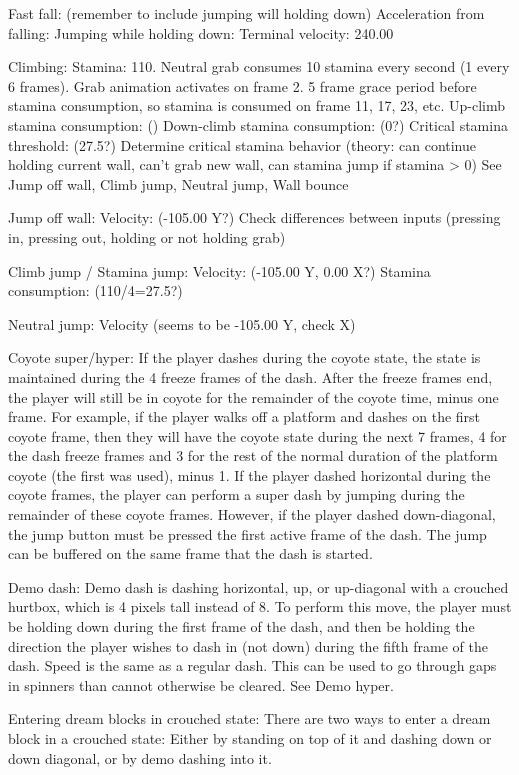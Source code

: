 \documentclass[oneside]{book}
\begin{document}
Fast fall: (remember to include jumping will holding down)
Acceleration from falling:
Jumping while holding down:
Terminal velocity: 240.00



Climbing:
Stamina: 110. Neutral grab consumes 10 stamina every second (1 every 6 frames). Grab animation activates on frame 2. 5 frame grace period before stamina consumption, so stamina is consumed on frame 11, 17, 23, etc.
Up-climb stamina consumption: ()
Down-climb stamina consumption: (0?)
Critical stamina threshold: (27.5?)
Determine critical stamina behavior (theory: can continue holding current wall, can't grab new wall, can stamina jump if stamina > 0)
See Jump off wall, Climb jump, Neutral jump, Wall bounce

Jump off wall:
Velocity: (-105.00 Y?)
Check differences between inputs (pressing in, pressing out, holding or not holding grab)

Climb jump / Stamina jump:
Velocity: (-105.00 Y, 0.00 X?)
Stamina consumption: (110/4=27.5?)

Neutral jump:
Velocity (seems to be -105.00 Y, check X)

Coyote super/hyper:
If the player dashes during the coyote state, the state is maintained during the 4 freeze frames of the dash. After the freeze frames end, the player will still be in coyote for the remainder of the coyote time, minus one frame. For example, if the player walks off a platform and dashes on the first coyote frame, then they will have the coyote state during the next 7 frames, 4 for the dash freeze frames and 3 for the rest of the normal duration of the platform coyote (the first was used), minus 1. If the player dashed horizontal during the coyote frames, the player can perform a super dash by jumping during the remainder of these coyote frames. However, if the player dashed down-diagonal, the jump button must be pressed the first active frame of the dash. The jump can be buffered on the same frame that the dash is started.

Demo dash:
Demo dash is dashing horizontal, up, or up-diagonal with a crouched hurtbox, which is 4 pixels tall instead of 8. To perform this move, the player must be holding down during the first frame of the dash, and then be holding the direction the player wishes to dash in (not down) during the fifth frame of the dash. Speed is the same as a regular dash. This can be used to go through gaps in spinners than cannot otherwise be cleared. See Demo hyper.

Entering dream blocks in crouched state:
There are two ways to enter a dream block in a crouched state: Either by standing on top of it and dashing down or down diagonal, or by demo dashing into it. 
\end{document}
